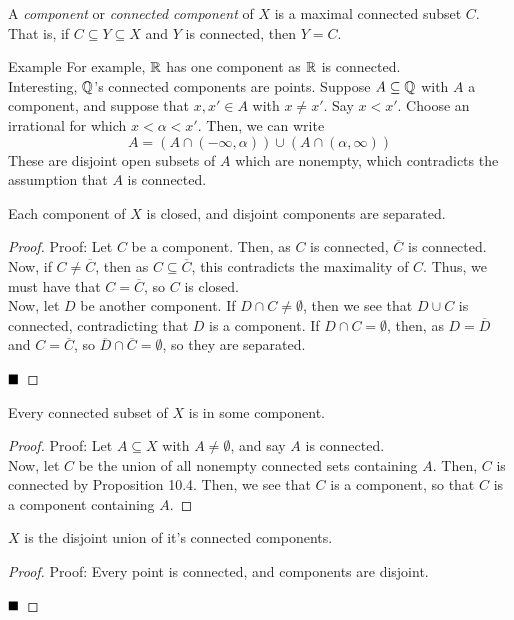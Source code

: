 \begin{definition}
    A \emph{component} or \emph{connected component} of $X$ is a maximal connected subset $C$. That is, if $C \subseteq Y \subseteq X$ and $Y$ is connected, then $Y = C$. 
\end{definition}
\begin{example}{Example}
    For example, $\mathbb{R}$ has one component as $\mathbb{R}$ is connected.\\
    
    Interesting, $\mathbb{Q}$'s connected components are points. Suppose $A \subseteq \mathbb{Q}$ with $A$ a component, and suppose that $x, x' \in A$ with $x \ne x'$. Say $x < x'$. Choose an irrational for which $x < \alpha < x'$. Then, we can write
    \[ A = \left(A \cap (-\infty, \alpha)\right) \cup (A \cap (\alpha, \infty)) \]
    These are disjoint open subsets of $A$ which are nonempty, which contradicts the assumption that $A$ is connected. 
\end{example}

\begin{lemma}
    Each component of $X$ is closed, and disjoint components are separated. 
\end{lemma}
\begin{proof}{Proof:}
    Let $C$ be a component. Then, as $C$ is connected, $\overline{C}$ is connected. Now, if $C \ne \overline{C}$, then as $C \subseteq \overline{C}$, this contradicts the maximality of $C$. Thus, we must have that $C = \overline{C}$, so $C$ is closed.\\

    Now, let $D$ be another component. If $D \cap C \ne \emptyset$, then we see that $D \cup C$ is connected, contradicting that $D$ is a component. If $D \cap C = \emptyset$, then, as $D = \overline{D}$ and $C = \overline{C}$, so $\overline{D} \cap \overline{C} = \emptyset$, so they are separated.

    $\qed$
\end{proof}

\begin{lemma}
    Every connected subset of $X$ is in some component. 
\end{lemma}
\begin{proof}{Proof:}
    Let $A \subseteq X$ with $A \ne \emptyset$, and say $A$ is connected.\\

    Now, let $C$ be the union of all nonempty connected sets containing $A$. Then, $C$ is connected by Proposition 10.4. Then, we see that $C$ is a component, so that $C$ is a component containing $A$.
\end{proof}

\begin{lemma}
    $X$ is the disjoint union of it's connected components.
\end{lemma}
\begin{proof}{Proof:}
    Every point is connected, and components are disjoint.

    $\qed$
\end{proof}